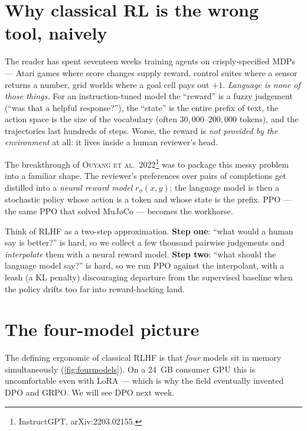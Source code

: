 \documentclass[11pt,oneside]{scrbook}
\begin{document}
\section{Why classical RL is the wrong tool, naively}

The reader has spent seventeen weeks training agents on
crisply-specified MDPs --- Atari games where score changes supply reward,
control suites where a sensor returns a number, grid worlds where a
goal cell pays out $+1$. \emph{Language is none of those things.} For
an instruction-tuned model the ``reward'' is a fuzzy judgement
(``was that a helpful response?''), the ``state'' is the entire prefix
of text, the action space is the size of the vocabulary (often
$30{,}000$--$200{,}000$ tokens), and the trajectories last hundreds of
steps. Worse, the reward is \emph{not provided by the environment} at
all: it lives inside a human reviewer's head.

The breakthrough of \textsc{Ouyang et al.\ 2022}\footnote{InstructGPT,
arXiv:2203.02155.} was to package this messy problem into a familiar
shape. The reviewer's preferences over pairs of completions get
distilled into a \emph{neural reward model} $r_\phi(x, y)$; the
language model is then a stochastic policy whose action is a token and
whose state is the prefix. PPO --- the same PPO that solved
MuJoCo --- becomes the workhorse.

\begin{intuition}
Think of RLHF as a two-step approximation. \textbf{Step one}: ``what
would a human say is better?'' is hard, so we collect a few thousand
pairwise judgements and \emph{interpolate} them with a neural reward
model. \textbf{Step two}: ``what should the language model say?'' is
hard, so we run PPO against the interpolant, with a leash (a KL
penalty) discouraging departure from the supervised baseline when the policy drifts
too far into reward-hacking land.
\end{intuition}

\section{The four-model picture}

The defining ergonomic of classical RLHF is that \emph{four} models
sit in memory simultaneously (\autoref{fig:fourmodels}). On a 24~GB
consumer GPU this is uncomfortable even with LoRA --- which is why
the field eventually invented DPO and GRPO. We will see DPO next week.
\end{document}
